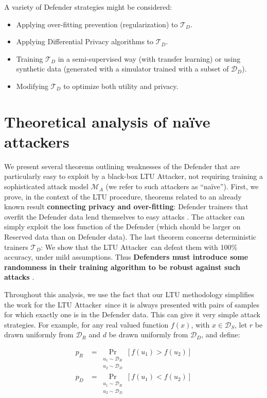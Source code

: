 \documentclass[letterpaper]{article}
\newcommand{\oracle}{LTU Attacker~}
\begin{document}
A variety of Defender strategies might be considered:
\begin{itemize}
\item Applying over-fitting prevention (regularization) to $\mathcal{T}_D$.
\item Applying Differential Privacy algorithms to $\mathcal{T}_D$.
\item Training $\mathcal{T}_D$ in a semi-supervised way (with transfer learning) or using synthetic data (generated with a simulator trained with a subset of $\mathcal{D}_D$).
\item Modifying $\mathcal{T}_D$ to optimize both utility and privacy.
\end{itemize}


\section{Theoretical analysis of na\"ive attackers}
We present several theorems outlining weaknesses of the Defender that are particularly easy to exploit by a black-box LTU Attacker, not requiring training a sophisticated attack model $\mathcal{M}_A$ (we refer to such attackers as ``na\"ive''). %
First, we prove, in the context of the LTU procedure, theorems related to an already known result {\bf connecting privacy and over-fitting}: Defender trainers that overfit the Defender data lend themselves to easy attacks  \cite{yeom2018privacy}. The attacker can simply exploit the loss function of the Defender (which should be larger on Reserved data than on Defender data).
The last theorem concerns deterministic trainers  $\mathcal{T}_D$: We show that the \oracle can defeat them with 100\% accuracy, under mild assumptions. Thus {\bf Defenders must introduce some randomness in their training algorithm to be robust against such attacks} \cite{Dwork2017}.

Throughout this analysis, we use the fact that our LTU methodology simplifies the work for the \oracle since it is always presented with pairs of samples for which exactly one is in the Defender data. This can give it very simple attack strategies.
For example, for any real valued function $f(x)$, with $x \in \mathcal{D}_S$, let $r$ be drawn uniformly from $\mathcal{D}_R$ and $d$ be drawn uniformly from $\mathcal{D}_D$, and define:

\begin{align}
p_R &= \mathop{Pr}_{\substack{u_1 \sim \mathcal{D}_R \\ u_2 \sim \mathcal{D}_D}}[f(u_1)>f(u_2)] \\
p_D &= \mathop{Pr}_{\substack{u_1 \sim \mathcal{D}_R \\ u_2 \sim \mathcal{D}_D}}[f(u_1)<f(u_2)]
\end{align}
\end{document}
